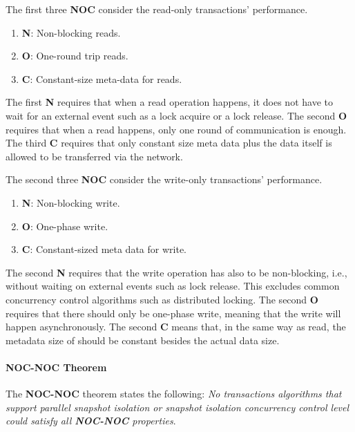 The first three \textbf{NOC} consider the read-only transactions' performance.


\begin{enumerate}
    \item \textbf{N}: Non-blocking reads. 
    \item \textbf{O}: One-round trip reads.
    \item \textbf{C}: Constant-size meta-data for reads.
\end{enumerate}


The first \textbf{N} requires that when a read operation happens, it does not have to wait for an external event such as a lock acquire or a lock release. The second \textbf{O} requires that when a read happens, only one round of communication is enough. The third \textbf{C} requires that only constant size meta data plus the data itself is allowed to be transferred via the network.

The second three \textbf{NOC} consider the write-only transactions' performance.


\begin{enumerate}
    \item \textbf{N}: Non-blocking write.
    \item \textbf{O}: One-phase write.
    \item \textbf{C}: Constant-sized meta data for write.
\end{enumerate}


The second \textbf{N} requires that the write operation has also to be non-blocking, i.e., without waiting on external events such as lock release. This excludes common concurrency control algorithms such as distributed locking. The second \textbf{O} requires that there should only be one-phase write, meaning that the write will happen asynchronously. The second \textbf{C} means that, in the same way as read, the metadata size of should be constant besides the actual data size.



\paragraph{NOC-NOC Theorem} 
The \textbf{NOC-NOC} theorem states the following: \textit{No transactions algorithms that support parallel snapshot isolation or snapshot isolation concurrency control level could satisfy all \textbf{NOC-NOC} properties}.

